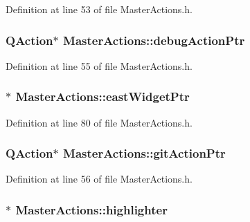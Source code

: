 Definition at line 53 of file Master\-Actions.\-h.

\hypertarget{class_master_actions_ae37993bbbed4a238ea3b11089ac46a61}{
\subsubsection[{debug\-Action\-Ptr}]{\setlength{\rightskip}{0pt plus 5cm}Q\-Action$\ast$ Master\-Actions\-::debug\-Action\-Ptr\hspace{0.3cm}{\ttfamily [private]}}}\label{class_master_actions_ae37993bbbed4a238ea3b11089ac46a61}


Definition at line 55 of file Master\-Actions.\-h.

\hypertarget{class_master_actions_a24c61c608d67e766f996d3a430a7bae0}{
\subsubsection[{east\-Widget\-Ptr}]{$\ast$ Master\-Actions\-::east\-Widget\-Ptr\hspace{0.3cm}{\ttfamily [private]}}}\label{class_master_actions_a24c61c608d67e766f996d3a430a7bae0}


Definition at line 80 of file Master\-Actions.\-h.

\hypertarget{class_master_actions_ac9e25741cf358793122b687e82f7bb85}{
\subsubsection[{git\-Action\-Ptr}]{\setlength{\rightskip}{0pt plus 5cm}Q\-Action$\ast$ Master\-Actions\-::git\-Action\-Ptr\hspace{0.3cm}{\ttfamily [private]}}}\label{class_master_actions_ac9e25741cf358793122b687e82f7bb85}


Definition at line 56 of file Master\-Actions.\-h.

\hypertarget{class_master_actions_a50b1565db8b7780ec4e88e59953aa67b}{
\subsubsection[{highlighter}]{$\ast$ Master\-Actions\-::highlighter\hspace{0.3cm}{\ttfamily [private]}}}\label{class_master_actions_a50b1565db8b7780ec4e88e59953aa67b}



